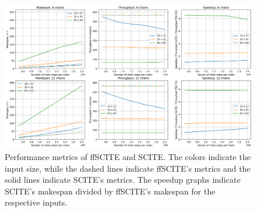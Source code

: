 \begin{figure}
    \includegraphics[width=\textwidth]{figures/performance.png}
    \caption{Performance metrics of \ac{ffSCITE} and \ac{SCITE}. The colors indicate the input size, while the dashed lines indicate \ac{ffSCITE}'s metrics and the solid lines indicate \ac{SCITE}'s metrics. The speedup graphs indicate \ac{SCITE}'s makespan divided by \ac{ffSCITE}'s makespan for the respective inputs.}
    \label{fig:performance}
\end{figure}
